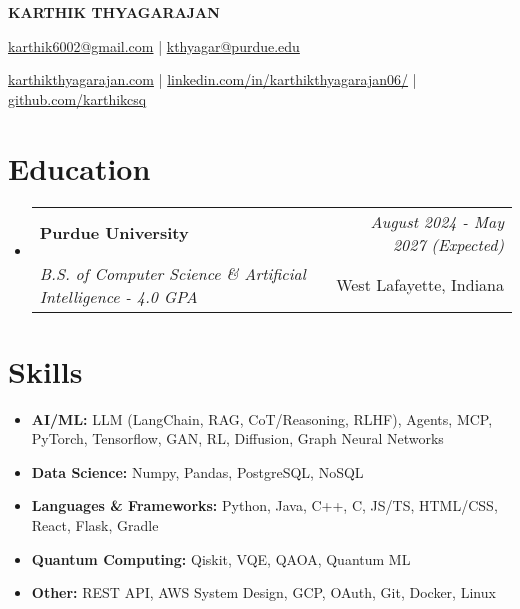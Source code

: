 \documentclass[a4paper,11pt]{article}
\makeatletter
\newcommand{\resumeItem}[2]{
  \item{
    \textbf{#1}{\hspace{0.5mm}#2 \vspace{-0.5mm}}
  }
}
\newcommand{\resumeSubheading}[4]{
\vspace{0.5mm}\item
    \begin{tabular*}{0.98\textwidth}[t]{l@{\extracolsep{\fill}}r}
        \textbf{#1} & \textit{\footnotesize{#4}} \\
        \textit{\footnotesize{#3}} &  \footnotesize{#2}\\
    \end{tabular*}
    \vspace{-2.4mm}
}
\newcommand{\resumeSubItem}[2]{\resumeItem{#1}{#2}\vspace{-4pt}}
\newcommand{\resumeSubHeadingListStart}{\begin{itemize}[leftmargin=*,labelsep=1mm]}
\newcommand{\resumeHeadingSkillStart}{\begin{itemize}[leftmargin=*,itemsep=1.7mm, rightmargin=2ex]}
\newcommand{\resumeSubHeadingListEnd}{\end{itemize}\vspace{2mm}}
\newcommand{\resumeHeadingSkillEnd}{\end{itemize}\vspace{-2mm}}
\newcommand{\socialicon}[1]{\raisebox{-0.05em}{\resizebox{!}{1em}{#1}}}
\newcommand{\headerfontiii}{\fontfamily{ppl}\selectfont} %
\makeatother
\begin{document}
\headerfontiii

\begin{center}
    {\Huge\textbf{KARTHIK THYAGARAJAN}}
\end{center}

\vspace{-7mm}

\begin{center}
    \small{
    \href{karthik6002@gmail.com}{karthik6002@gmail.com} | 
    \href{kthyagar@purdue.edu}{kthyagar@purdue.edu}
    
    \href{https://www.karthikthyagarajan.com}
    {karthikthyagarajan.com} | 
    \socialicon{\faLinkedin} \href{https://www.linkedin.com/in/karthikthyagarajan06}{linkedin.com/in/karthikthyagarajan06/} | 
    \socialicon{\faGithub} \href{https://github.com/karthikcsq}{github.com/karthikcsq} 
    }
\end{center}

\section{\textbf{Education}}
\resumeSubHeadingListStart


  \resumeSubheading
  { Purdue University }
  { West Lafayette, Indiana }
  { B.S. of Computer Science \& Artificial Intelligence - 4.0 GPA }
  { August 2024 - May 2027 (Expected) }


\resumeSubHeadingListEnd

\vspace{-6mm}

\section{\textbf{Skills}}
\resumeHeadingSkillStart

  \resumeSubItem{AI/ML: }{LLM (LangChain, RAG, CoT/Reasoning, RLHF), Agents, MCP, PyTorch, Tensorflow, GAN, RL, Diffusion, Graph Neural Networks}

  \resumeSubItem{Data Science: }{Numpy, Pandas, PostgreSQL, NoSQL}

  \resumeSubItem{Languages \& Frameworks: }{Python, Java, C++, C, JS/TS, HTML/CSS, React, Flask, Gradle}

  \resumeSubItem{Quantum Computing: }{Qiskit, VQE, QAOA, Quantum ML}

  \resumeSubItem{Other: }{REST API, AWS System Design, GCP, OAuth, Git, Docker, Linux}

\resumeHeadingSkillEnd
\end{document}
